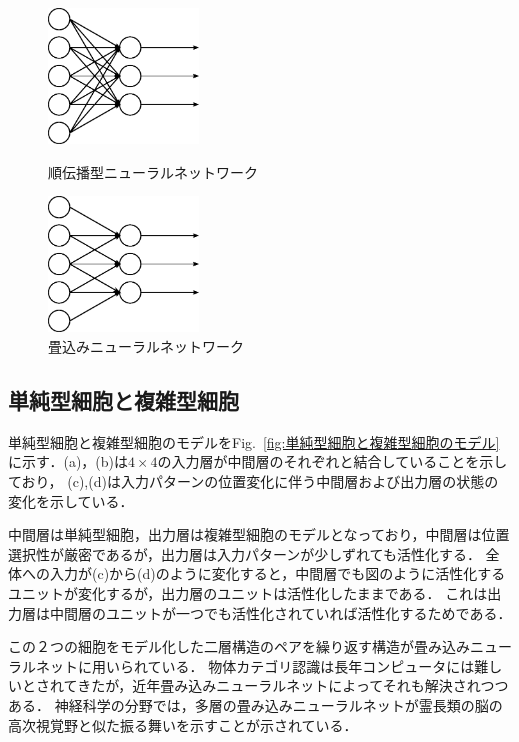 \documentclass[a4paper,10pt]{jsarticle}
\begin{document}
\begin{figure}[htbp]
 \begin{minipage}{0.5\hsize}
  \begin{center}
   \includegraphics[width=40mm]{fig/eps/FNN.eps}
  \end{center}
  \caption{順伝播型ニューラルネットワーク}
  \label{fig:FNN}
 \end{minipage}
 \begin{minipage}{0.5\hsize}
  \begin{center}
   \includegraphics[width=40mm]{fig/eps/CNN.eps}
  \end{center}
  \caption{畳込みニューラルネットワーク}
  \label{fig:CNN}
 \end{minipage}
\end{figure}



\subsection{単純型細胞と複雑型細胞}
単純型細胞と複雑型細胞のモデルをFig.~\ref{fig:単純型細胞と複雑型細胞のモデル}に示す．(a)，(b)は$4\times4$の入力層が中間層のそれぞれと結合していることを示しており，
(c),(d)は入力パターンの位置変化に伴う中間層および出力層の状態の変化を示している．

中間層は単純型細胞，出力層は複雑型細胞のモデルとなっており，中間層は位置選択性が厳密であるが，出力層は入力パターンが少しずれても活性化する．
全体への入力が(c)から(d)のように変化すると，中間層でも図のように活性化するユニットが変化するが，出力層のユニットは活性化したままである．
これは出力層は中間層のユニットが一つでも活性化されていれば活性化するためである．

この２つの細胞をモデル化した二層構造のペアを繰り返す構造が畳み込みニューラルネットに用いられている．
物体カテゴリ認識は長年コンピュータには難しいとされてきたが，近年畳み込みニューラルネットによってそれも解決されつつある．
神経科学の分野では，多層の畳み込みニューラルネットが霊長類の脳の高次視覚野と似た振る舞いを示すことが示されている．
\end{document}
